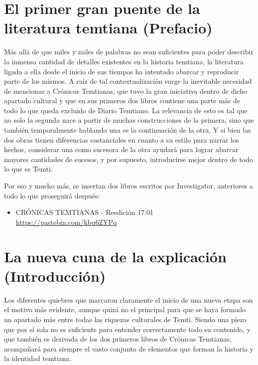 \documentclass[
  spanish,
]{book}
\providecommand{\tightlist}{%
  \setlength{\itemsep}{0pt}\setlength{\parskip}{0pt}}
\begin{document}
\hypertarget{el-primer-gran-puente-de-la-literatura-temtiana-prefacio}{%
\chapter{El primer gran puente de la literatura temtiana (Prefacio)}\label{el-primer-gran-puente-de-la-literatura-temtiana-prefacio}}

Más allá de que miles y miles de palabras no sean suficientes para poder describir la inmensa cantidad de detalles existentes en la historia temtiana, la literatura ligada a ella desde el inicio de sus tiempos ha intentado abarcar y reproducir parte de los mismos. A raíz de tal contextualización surge la inevitable necesidad de mencionar a Crónicas Temtianas, que tuvo la gran iniciativa dentro de dicho apartado cultural y que en sus primeros dos libros contiene una parte más de todo lo que queda excluido de Diario Temtiano.
La relevancia de esto es tal que no solo la segunda nace a partir de muchas construcciones de la primera, sino que también temporalmente hablando una es la continuación de la otra. Y si bien las dos obras tienen diferencias sustanciales en cuanto a su estilo para narrar los hechos, considerar una como sucesora de la otra ayudará para lograr abarcar mayores cantidades de sucesos, y por supuesto, introducirse mejor dentro de todo lo que es Temti.

Por eso y mucho más, se insertan dos libros escritos por Investigator, anteriores a todo lo que proseguirá después:

\begin{itemize}
\tightlist
\item
  CRÓNICAS TEMTIANAS - Reedición 17.01
  \url{https://pastebin.com/kbu6ZYPq}
\end{itemize}

\hypertarget{la-nueva-cuna-de-la-explicaciuxf3n-introducciuxf3n}{%
\chapter{La nueva cuna de la explicación (Introducción)}\label{la-nueva-cuna-de-la-explicaciuxf3n-introducciuxf3n}}

Los diferentes quiebres que marcaron claramente el inicio de una nueva etapa son el motivo más evidente, aunque quizá no el principal para que se haya formado un apartado más entre todas las riquezas culturales de Temti.
Siendo una pieza que por sí sola no es suficiente para entender correctamente todo su contenido, y que también es derivada de los dos primeros libros de Crónicas Temtianas, acompañará para siempre el vasto conjunto de elementos que forman la historia y la identidad temtiana.
\end{document}
